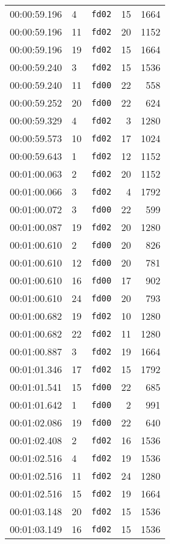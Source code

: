 \documentclass{article}
\begin{document}
\begin{longtable}{lllrr}
00:00:59.196 & 4 & \texttt{fd02} & 15 & 1664 \\
00:00:59.196 & 11 & \texttt{fd02} & 20 & 1152 \\
00:00:59.196 & 19 & \texttt{fd02} & 15 & 1664 \\
00:00:59.240 & 3 & \texttt{fd02} & 15 & 1536 \\
00:00:59.240 & 11 & \texttt{fd00} & 22 & 558 \\
00:00:59.252 & 20 & \texttt{fd00} & 22 & 624 \\
00:00:59.329 & 4 & \texttt{fd02} & 3 & 1280 \\
00:00:59.573 & 10 & \texttt{fd02} & 17 & 1024 \\
00:00:59.643 & 1 & \texttt{fd02} & 12 & 1152 \\
00:01:00.063 & 2 & \texttt{fd02} & 20 & 1152 \\
00:01:00.066 & 3 & \texttt{fd02} & 4 & 1792 \\
00:01:00.072 & 3 & \texttt{fd00} & 22 & 599 \\
00:01:00.087 & 19 & \texttt{fd02} & 20 & 1280 \\
00:01:00.610 & 2 & \texttt{fd00} & 20 & 826 \\
00:01:00.610 & 12 & \texttt{fd00} & 20 & 781 \\
00:01:00.610 & 16 & \texttt{fd00} & 17 & 902 \\
00:01:00.610 & 24 & \texttt{fd00} & 20 & 793 \\
00:01:00.682 & 19 & \texttt{fd02} & 10 & 1280 \\
00:01:00.682 & 22 & \texttt{fd02} & 11 & 1280 \\
00:01:00.887 & 3 & \texttt{fd02} & 19 & 1664 \\
00:01:01.346 & 17 & \texttt{fd02} & 15 & 1792 \\
00:01:01.541 & 15 & \texttt{fd00} & 22 & 685 \\
00:01:01.642 & 1 & \texttt{fd00} & 2 & 991 \\
00:01:02.086 & 19 & \texttt{fd00} & 22 & 640 \\
00:01:02.408 & 2 & \texttt{fd02} & 16 & 1536 \\
00:01:02.516 & 4 & \texttt{fd02} & 19 & 1536 \\
00:01:02.516 & 11 & \texttt{fd02} & 24 & 1280 \\
00:01:02.516 & 15 & \texttt{fd02} & 19 & 1664 \\
00:01:03.148 & 20 & \texttt{fd02} & 15 & 1536 \\
00:01:03.149 & 16 & \texttt{fd02} & 15 & 1536 \\

\end{longtable}
\end{document}
